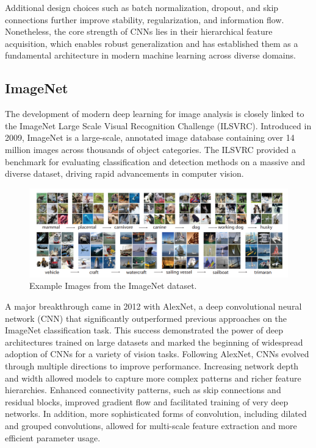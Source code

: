 Additional design choices such as batch normalization, dropout, and skip connections further improve stability, regularization, and information flow. Nonetheless, the core strength of CNNs lies in their hierarchical feature acquisition, which enables robust generalization and has established them as a fundamental architecture in modern machine learning across diverse domains.

\subsection{ImageNet}

The development of modern deep learning for image analysis is closely linked to the ImageNet Large Scale Visual Recognition Challenge (ILSVRC). Introduced in 2009, ImageNet is a large-scale, annotated image database containing over 14 million images across thousands of object categories. The ILSVRC provided a benchmark for evaluating classification and detection methods on a massive and diverse dataset, driving rapid advancements in computer vision. 

\begin{figure}
    \centering
    \includegraphics[width=1\linewidth]{Images/SOTA/ImageNet.png}
    \caption{Example Images from the ImageNet dataset.}
    \label{fig:ImageNet}
\end{figure}

A major breakthrough came in 2012 with AlexNet, a deep convolutional neural network (CNN) that significantly outperformed previous approaches on the ImageNet classification task. This success demonstrated the power of deep architectures trained on large datasets and marked the beginning of widespread adoption of CNNs for a variety of vision tasks. Following AlexNet, CNNs evolved through multiple directions to improve performance. Increasing network depth and width allowed models to capture more complex patterns and richer feature hierarchies. Enhanced connectivity patterns, such as skip connections and residual blocks, improved gradient flow and facilitated training of very deep networks. In addition, more sophisticated forms of convolution, including dilated and grouped convolutions, allowed for multi-scale feature extraction and more efficient parameter usage.

